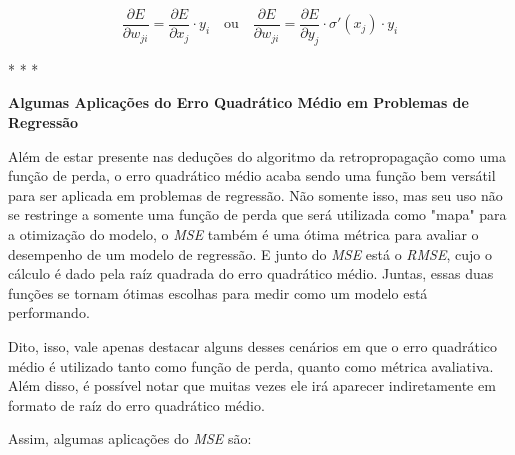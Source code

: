 \begin{equation}
    \frac{\partial E}{\partial w_{ji}} = \frac{\partial E}{\partial x_j} \cdot y_i \quad \text{ou} \quad \frac{\partial E}{\partial w_{ji}} = \frac{\partial E}{\partial y_j} \cdot \sigma'(x_j) \cdot y_i
    \label{eq:gradiente-do-erro-em-relacao-a-um-peso-de-um-neuronio-perda-regressao}
\end{equation}

\medskip
\begin{center}
 * * *
\end{center}
\medskip

\textbf{Algumas Aplicações do Erro Quadrático Médio em Problemas de Regressão}
\vspace{1em}

Além de estar presente nas deduções do algoritmo da retropropagação como uma função de perda, o erro quadrático médio acaba sendo uma função bem versátil para ser aplicada em problemas de regressão. Não somente isso, mas seu uso não se restringe a somente uma função de perda que será utilizada como "mapa" para a otimização do modelo, o \textit{MSE} também é uma ótima métrica para avaliar o desempenho de um modelo de regressão. E junto do \textit{MSE} está o \textit{RMSE}, cujo o cálculo é dado pela raíz quadrada do erro quadrático médio. Juntas, essas duas funções se tornam ótimas escolhas para medir como um modelo está performando.

Dito, isso, vale apenas destacar alguns desses cenários em que o erro quadrático médio é utilizado tanto como função de perda, quanto como métrica avaliativa. Além disso, é possível notar que muitas vezes ele irá aparecer indiretamente em formato de raíz do erro quadrático médio.

Assim, algumas aplicações do \textit{MSE} são:

